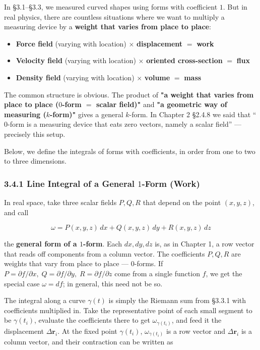 \documentclass[a4paper,12pt,openany]{book}
\begin{document}
In §3.1–§3.3, we measured curved shapes using forms with coefficient
\(1\). But in real physics, there are countless situations where we want
to multiply a measuring device by a
\textbf{weight that varies from place to place}:

\begin{itemize}
\item
  \textbf{Force field} (varying with location) \(\times\)
  \textbf{displacement} \(=\) \textbf{work}
\item
  \textbf{Velocity field} (varying with location) \(\times\)
  \textbf{oriented cross-section} \(=\) \textbf{flux}
\item
  \textbf{Density field} (varying with location) \(\times\)
  \textbf{volume} \(=\) \textbf{mass}
\end{itemize}

The common structure is obvious. The product of
\textbf{"a weight that varies from place to place ($0$-form $=$ scalar field)"}
and \textbf{"a geometric way of measuring ($k$-form)"} gives a general
\(k\)-form. In Chapter 2 §2.4.8 we said that ``\(0\)-form is a measuring
device that eats zero vectors, namely a scalar field'' — precisely
this setup.

Below, we define the integrals of forms with coefficients, in order from
one to two to three dimensions.

\hypertarget{line-integral-of-a-general-1-form-work}{%
\subsubsection{\texorpdfstring{3.4.1 Line Integral of a General
\(1\)-Form
(Work)}{3.4.1 Line Integral of a General 1-Form (Work)}}\label{line-integral-of-a-general-1-form-work}}

In real space, take three scalar fields \(P, Q, R\) that depend on the
point \((x,y,z)\), and call

\[\omega = P(x,y,z)\,dx + Q(x,y,z)\,dy + R(x,y,z)\,dz\]

the \textbf{general form of a $1$-form}. Each \(dx, dy, dz\) is, as in
Chapter 1, a row vector that reads off components from a column vector.
The coefficients \(P,Q,R\) are weights that vary from place to place —
\(0\)-forms. If
\(P=\partial f/\partial x,\;Q=\partial f/\partial y,\;R=\partial f/\partial z\)
come from a single function \(f\), we get the special case
\(\omega=df\); in general, this need not be so.

The integral along a curve \(\gamma(t)\) is simply the Riemann sum from
§3.3.1 with coefficients multiplied in. Take the representative point of
each small segment to be \(\gamma(t_i)\), evaluate the coefficients
there to get \(\omega_{\gamma(t_i)}\), and feed it the displacement
\(\Delta\mathbf{r}_i\). At the fixed point \(\gamma(t_i)\),
\(\omega_{\gamma(t_i)}\) is a row vector and \(\Delta\mathbf{r}_i\) is a
column vector, and their contraction can be written as
\end{document}
